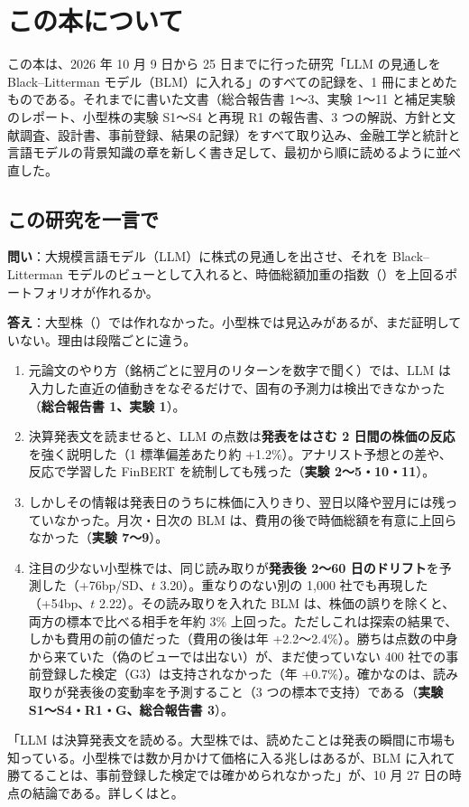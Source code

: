 \chapter*{この本について}
\label{ch:about}

この本は、2026 年 10 月 9 日から 25 日までに行った研究「LLM の見通しを Black--Litterman モデル（BLM）に入れる」のすべての記録を、1 冊にまとめたものである。それまでに書いた文書（総合報告書 1〜3、実験 1〜11 と補足実験のレポート、小型株の実験 S1〜S4 と再現 R1 の報告書、3 つの解説、方針と文献調査、設計書、事前登録、結果の記録）をすべて取り込み、金融工学と統計と言語モデルの背景知識の章を新しく書き足して、最初から順に読めるように並べ直した。

\section*{この研究を一言で}

\begin{keybox}[問いと答え]
\textbf{問い}：大規模言語モデル（LLM）に株式の見通しを出させ、それを Black--Litterman モデルのビューとして入れると、時価総額加重の指数（\SP{}）を上回るポートフォリオが作れるか。

\textbf{答え}：大型株（\SP{}）では作れなかった。小型株では見込みがあるが、まだ証明していない。理由は段階ごとに違う。
\begin{enumerate}
\item 元論文のやり方（銘柄ごとに翌月のリターンを数字で聞く）では、LLM は入力した直近の値動きをなぞるだけで、固有の予測力は検出できなかった（\textbf{総合報告書 1、実験 1}）。
\item 決算発表文を読ませると、LLM の点数は\textbf{発表をはさむ 2 日間の株価の反応}を強く説明した（1 標準偏差あたり約 +1.2\%）。アナリスト予想との差や、反応で学習した FinBERT を統制しても残った（\textbf{実験 2〜5・10・11}）。
\item しかしその情報は発表日のうちに株価に入りきり、翌日以降や翌月には残っていなかった。月次・日次の BLM は、費用の後で時価総額を有意に上回らなかった（\textbf{実験 7〜9}）。
\item 注目の少ない小型株では、同じ読み取りが\textbf{発表後 2〜60 日のドリフト}を予測した（+76bp/SD、$t$ 3.20）。重なりのない別の 1,000 社でも再現した（+54bp、$t$ 2.22）。その読み取りを入れた BLM は、株価の誤りを除くと、両方の標本で比べる相手を年約 3\% 上回った。ただしこれは探索の結果で、しかも費用の前の値だった（費用の後は年 +2.2〜2.4\%）。勝ちは点数の中身から来ていた（偽のビューでは出ない）が、まだ使っていない 400 社での事前登録した検定（G3）は支持されなかった（年 +0.7\%）。確かなのは、読み取りが発表後の変動率を予測すること（3 つの標本で支持）である（\textbf{実験 S1〜S4・R1・G、総合報告書 3}）。
\end{enumerate}
「LLM は決算発表文を読める。大型株では、読めたことは発表の瞬間に市場も知っている。小型株では数か月かけて価格に入る兆しはあるが、BLM に入れて勝てることは、事前登録した検定では確かめられなかった」が、10 月 27 日の時点の結論である。詳しくはと。
\end{keybox}


